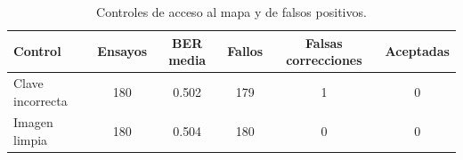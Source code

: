\begin{table}[H]
\centering
\scriptsize
\caption{Controles de acceso al mapa y de falsos positivos.}
\label{tab:controles}
\begin{tabular}{|l|c|c|c|c|c|}
\hline
\rowcolor{uocnavy}
\color{white}\textbf{Control} &
\color{white}\textbf{Ensayos} &
\color{white}\textbf{BER media} &
\color{white}\textbf{Fallos} &
\color{white}\textbf{Falsas correcciones} &
\color{white}\textbf{Aceptadas} \\
\hline
Clave incorrecta & 180 & 0{.}502 & 179 & 1 & 0 \\
\hline
Imagen limpia & 180 & 0{.}504 & 180 & 0 & 0 \\
\hline
\end{tabular}
\end{table}
